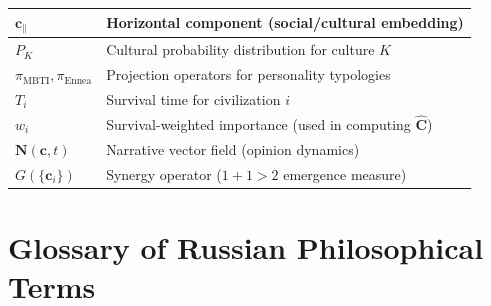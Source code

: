\documentclass[11pt,a4paper]{article}
\theoremstyle{definition}
\theoremstyle{remark}
\newcommand{\cc}{\mathbf{c}}
\begin{document}
\begin{longtable}{|l|p{10cm}|}
\hline
\(\cc_{\parallel}\) & Horizontal component (social/cultural embedding) \\
\hline
\(P_K\) & Cultural probability distribution for culture \(K\) \\
\hline
\(\pi_{\text{MBTI}}, \pi_{\text{Ennea}}\) & Projection operators for personality typologies \\
\hline
\(T_i\) & Survival time for civilization \(i\) \\
\hline
\(w_i\) & Survival-weighted importance (used in computing \(\hat{\mathbf{C}}\)) \\
\hline
\(\mathbf{N}(\cc, t)\) & Narrative vector field (opinion dynamics) \\
\hline
\(G(\{\cc_i\})\) & Synergy operator (\(1+1>2\) emergence measure) \\
\hline
\end{longtable}

\section{Glossary of Russian Philosophical Terms}
\end{document}
